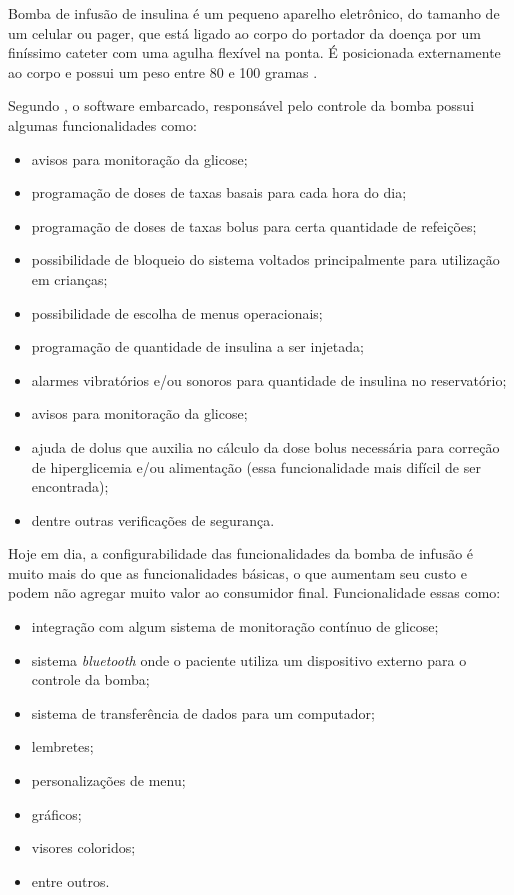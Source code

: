 Bomba de infusão de insulina é um pequeno aparelho eletrônico, do tamanho de um celular ou pager, que está ligado ao corpo do portador da doença por um finíssimo cateter com uma agulha flexível na ponta. É posicionada externamente ao corpo e possui um peso entre 80 e 100 gramas \cite{minicucci2008uso}.

Segundo \cite{amorim2008novas}, o software embarcado, responsável pelo controle da bomba possui algumas funcionalidades como:

\begin{itemize}
\item avisos para monitoração da glicose;
\item programação de doses de taxas basais para cada hora do dia;
\item programação de doses de taxas bolus para certa quantidade de refeições;
\item possibilidade de bloqueio do sistema voltados principalmente para utilização em crianças;
\item possibilidade de escolha de menus operacionais;
\item programação de quantidade de insulina a ser injetada;
\item alarmes vibratórios e/ou sonoros para quantidade de insulina no reservatório;
\item avisos para monitoração da glicose;
\item ajuda de dolus que auxilia no cálculo da dose bolus necessária para correção de hiperglicemia e/ou alimentação (essa funcionalidade mais difícil de ser encontrada);
\item dentre outras verificações de segurança.
\end{itemize}

Hoje em dia, a configurabilidade das funcionalidades da bomba de infusão é muito mais do que as funcionalidades básicas, o que aumentam seu custo e podem não agregar muito valor ao consumidor final. Funcionalidade essas como:

\begin{itemize}
\item integração com algum sistema de monitoração contínuo de glicose;
\item sistema \emph{bluetooth} onde o paciente utiliza um dispositivo externo para o controle da bomba;
\item sistema de transferência de dados para um computador;
\item lembretes;
\item personalizações de menu;
\item gráficos;
\item visores coloridos;
\item entre outros.
\end{itemize}

